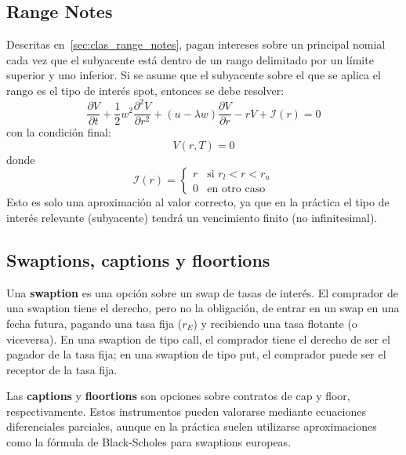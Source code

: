 \subsection{Range Notes}
Descritas en~\ref{sec:clas_range_notes}, pagan intereses sobre un principal nomial cada vez que el subyacente está dentro de un rango delimitado por un límite superior y uno inferior. Si se asume que el subyacente sobre el que se aplica el rango es el tipo de interés spot, entonces se debe resolver:
\begin{equation*}
    \boxed{
        \frac{\partial V}{\partial t}
        + \frac{1}{2} w^2 \frac{\partial^2 V}{\partial r^2}
        + (u - \lambda w) \frac{\partial V}{\partial r}
        - rV + \mathcal{I}(r) = 0
    }
\end{equation*}
con la condición final:
\begin{equation*}
    V(r, T) = 0
\end{equation*}
donde
\begin{equation*}
    \mathcal{I}(r) = 
    \begin{cases}
        r & \text{si } r_l < r < r_u \\
        0 & \text{en otro caso}
    \end{cases}
\end{equation*}
Esto es solo una aproximación al valor correcto, ya que en la práctica el tipo de interés relevante (subyacente) tendrá un vencimiento finito (no infinitesimal).




\subsection{Swaptions, captions y floortions}

Una \textbf{swaption} es una opción sobre un swap de tasas de interés. El comprador de una swaption tiene el derecho, pero no la obligación, de entrar en un swap en una fecha futura, pagando una tasa fija ($r_E$) y recibiendo una tasa flotante (o viceversa). En una swaption de tipo call, el comprador tiene el derecho de ser el pagador de la tasa fija; en una swaption de tipo put, el comprador puede ser el receptor de la tasa fija.

Las \textbf{captions} y \textbf{floortions} son opciones sobre contratos de cap y floor, respectivamente. Estos instrumentos pueden valorarse mediante ecuaciones diferenciales parciales, aunque en la práctica suelen utilizarse aproximaciones como la fórmula de Black-Scholes para swaptions europeas.

